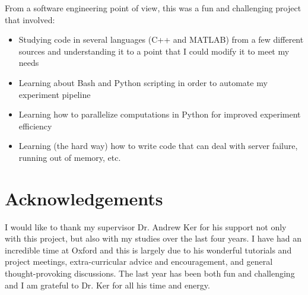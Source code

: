 \documentclass[11pt,a4paper,twoside,openright]{report}
\begin{document}
From a software engineering point of view, this was a fun and challenging project that involved:
\begin{itemize}
	\item Studying code in several languages (C++ and MATLAB) from a few different sources and understanding it to a point that I could modify it to meet my needs
	\item Learning about Bash and Python scripting in order to automate my experiment pipeline
	\item Learning how to parallelize computations in Python for improved experiment efficiency
	\item Learning (the hard way) how to write code that can deal with server failure, running out of memory, etc.
\end{itemize}


\chapter*{Acknowledgements}

I would like to thank my supervisor Dr. Andrew Ker for his support not only with this project, but also with my studies over the last four years. I have had an incredible time at Oxford and this is largely due to his wonderful tutorials and project meetings, extra-curricular advice and encouragement, and general thought-provoking discussions. The last year has been both fun and challenging and I am grateful to Dr. Ker for all his time and energy.


{}

\end{document}
